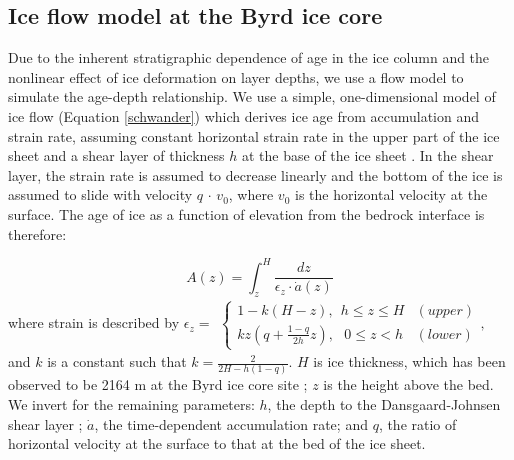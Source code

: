 \subsection{Ice flow model at the Byrd ice core}

Due to the inherent stratigraphic dependence of age in the ice column and the nonlinear effect of ice deformation on layer depths, we use a flow model to simulate the age-depth relationship. We use a simple, one-dimensional model of ice flow (Equation \ref{schwander}) which derives ice age from accumulation and strain rate, assuming constant horizontal strain rate in the upper part of the ice sheet and a shear layer of thickness $h$ at the base of the ice sheet \citep{schwander2001}. In the shear layer, the strain rate is assumed to decrease linearly and the bottom of the ice is assumed to slide with velocity $q$ $\cdot$ $v_0$, where $v_0$ is the horizontal velocity at the surface. The age of ice as a function of elevation from the bedrock interface is therefore:

\begin{equation}\label{schwander}
A(z) = \int_{z}^{H} \frac{dz}{\epsilon_z \cdot \dot{a}(z)}
\end{equation}
where strain is described by
$    \epsilon_z=
	\begin{aligned}
    \begin{cases}
                 1-k(H-z), \:\:  h \leq z \leq H  & (upper) \\
                  kz(q+\frac{1-q}{2h}z), \:\:\: 0 \leq z < h &(lower)
    \end{cases}, 
    \end{aligned}
$
and $k$ is a constant such that $k = \frac{2}{2H - h(1-q)}$. $H$ is ice thickness, which has been observed to be 2164 m at the Byrd ice core site \citep{gow1968}; $z$ is the height above the bed. We invert for the remaining parameters: $h$, the depth to the Dansgaard-Johnsen shear layer \citep{dansgaardjohnsen1969}; $\dot{a}$, the time-dependent accumulation rate; and $q$, the ratio of horizontal velocity at the surface to that at the bed of the ice sheet.

